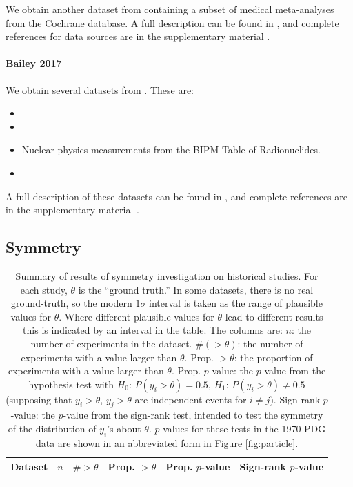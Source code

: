 \documentclass[letterpaper,12pt]{article}
\begin{document}
We obtain another dataset from \citet{bailey2017not} containing a subset of medical meta-analyses from the Cochrane database. A full description can be found in \citet[sec.~2.1-2.3]{bailey2017not}, and complete references for data sources are in the supplementary material \citep{bailey2016data}.

\paragraph{Bailey 2017} We obtain several datasets from \citet{bailey2017not}. These are:
\begin{itemize}
  \item 
  \item
  \item Nuclear physics measurements from the BIPM Table of Radionuclides.
  \item 
\end{itemize}
A full description of these datasets can be found in \citet[sec.~2.1-2.2, 3.4]{bailey2017not}, and complete references are in the supplementary material \citep{bailey2016data}.


\subsection{Symmetry}\label{sec:historical-assumptions-check}

\begin{table}[htbp]
  \centering
  \caption{Summary of results of symmetry investigation on historical studies. For each study, $\theta$ is the ``ground truth.'' In some datasets, there is no real ground-truth, so the modern $1\sigma$ interval is taken as the range of plausible values for $\theta$. Where different plausible values for $\theta$ lead to different results this is indicated by an interval in the table. The columns are: $n$: the number of experiments in the dataset. $\#(>\theta)$: the number of experiments with a value larger than $\theta$. Prop. $>\theta$: the proportion of experiments with a value larger than $\theta$. Prop. $p$-value: the $p$-value from the hypothesis test with $H_0$: $P(y_i>\theta)=0.5$, $H_1$: $P(y_i>\theta)\neq 0.5$ (supposing that $y_i>\theta$, $y_j>\theta$ are independent events for $i\neq j$). Sign-rank $p$-value: the $p$-value from the sign-rank test, intended to test the symmetry of the distribution of $y_i$'s about $\theta$. $p$-values for these tests in the 1970 PDG data are shown in an abbreviated form in Figure \ref{fig:particle}.}
  \label{tab:hist-sym}
  \smaller
  \begin{tabular}{l|rcccc}
    \hline Dataset & $n$ & $\#>\theta$ & Prop. $>\theta$ & Prop. $p$-value & Sign-rank $p$-value \\\hline\\\hline
  \end{tabular}
\end{table}
\end{document}
